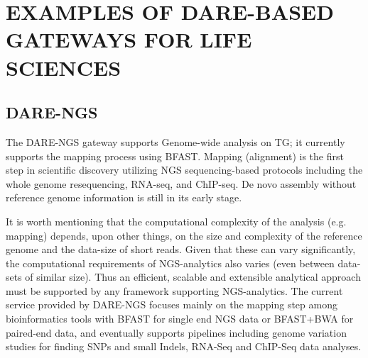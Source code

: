 \documentclass[]{article}
\begin{document}
\section{EXAMPLES OF DARE-BASED GATEWAYS FOR LIFE SCIENCES}


\subsection{DARE-NGS}
The DARE-NGS gateway %
supports Genome-wide analysis on TG; it currently supports the mapping
process using BFAST. Mapping (alignment) is the first
step in scientific discovery utilizing NGS sequencing-based protocols
including the whole genome resequencing, RNA-seq, and ChIP-seq.  De
novo assembly without reference genome information is still in its
early stage.

It is worth mentioning that the computational complexity of the
analysis (e.g. mapping) depends, upon other things, on the size and
complexity of the reference genome and the data-size of short reads.
Given that these can vary significantly, the computational
requirements of NGS-analytics also varies (even between data-sets of
similar size).  Thus an efficient, scalable and extensible analytical
approach must be supported by any framework supporting NGS-analytics.
The current service provided by DARE-NGS focuses mainly on the mapping
step among bioinformatics tools with BFAST for single end NGS data or
BFAST+BWA for paired-end data, and eventually supports pipelines
including genome variation studies for finding SNPs and small Indels,
RNA-Seq and ChIP-Seq data analyses.

\end{document}

